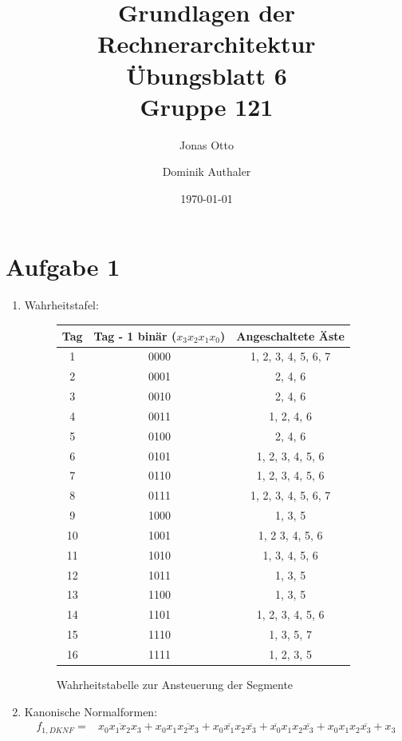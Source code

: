 \documentclass[a4paper]{article}
\title{Grundlagen der Rechnerarchitektur\\ Übungsblatt 6\\Gruppe 121\\}
\author{Jonas Otto\and Dominik Authaler}
\date{\today}
\begin{document}
\maketitle

\section*{Aufgabe 1}
\begin{enumerate}[label=\alph*)]
	\item Wahrheitstafel:
	\begin{figure}[h!]
		\centering
		\begin{tabular}{|c|c|c|}
			\hline
			Tag & Tag - 1 binär ($x_3x_2x_1x_0$) & Angeschaltete Äste \\
			\hline
			1 & 0000 & 1, 2, 3, 4, 5, 6, 7\\
			2 & 0001 & 2, 4, 6\\
			3 & 0010 & 2, 4, 6\\
			4 & 0011 & 1, 2, 4, 6\\
			5 & 0100 & 2, 4, 6\\
			6 & 0101 & 1, 2, 3, 4, 5, 6\\
			7 & 0110 & 1, 2, 3, 4, 5, 6\\
			8 & 0111 & 1, 2, 3, 4, 5, 6, 7\\
			9 & 1000 & 1, 3, 5\\
			10 & 1001 & 1, 2 3, 4, 5, 6\\
			11 & 1010 & 1, 3, 4, 5, 6\\
			12 & 1011 & 1, 3, 5\\
			13 & 1100 & 1, 3, 5\\
			14 & 1101 & 1, 2, 3, 4, 5, 6\\
			15 & 1110 & 1, 3, 5, 7\\
			16 & 1111 & 1, 2, 3, 5\\
			\hline
		\end{tabular}
		\caption{Wahrheitstabelle zur Ansteuerung der Segmente}
	\end{figure}

	\item Kanonische Normalformen:
	\begin{equation*}
	\begin{aligned}
		f_{1, DKNF} = &\overline{x_0 x_1 x_2 x_3} + x_0 x_1\overline{x_2 x_3} + x_0 \overline{x_1} x_2 \overline{x_3} + \overline{x_0} x_1 x_2 \overline{x_3} + x_0 x_1 x_2 \overline{x_3} +  x_3 
	\end{aligned}
	\end{equation*}
	

\end{enumerate}
\end{document}

